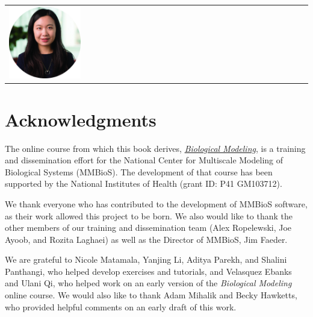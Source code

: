 {\begin{tabular}[]{l @{\hskip 0.05\textwidth} l}
\parbox{0.25\textwidth}{\noindent \href{https://www.linkedin.com/in/shuanger-li-38b300133/}{\includegraphics[width=0.25\textwidth]{../images_CMYK/li_shuanger_circle}}} & \parbox{0.7\textwidth}{}\\

\end{tabular}
}

\newpage


 
\clearpage
{}
\chapter{Acknowledgments}
\label{chapter:acknowledgments}

The online course from which this book derives, \href{https://biologicalmodeling.org}{\textit{Biological Modeling}}, is a training and dissemination effort for the National Center for Multiscale Modeling of Biological Systems (MMBioS). The development of that course has been supported by the National Institutes of Health (grant ID: P41 GM103712).

We  thank everyone who has contributed to the development of MMBioS software, as their work allowed this project to be born. We also would like to thank the other members of our training and dissemination team (Alex Ropelewski, Joe Ayoob, and Rozita Laghaei) as well as the Director of MMBioS, Jim Faeder.

We are grateful to Nicole Matamala, Yanjing Li, Aditya Parekh, and Shalini Panthangi, who helped develop exercises and tutorials, and Velasquez Ebanks and Ulani Qi, who helped work on an early version of the \textit{Biological Modeling} online course. We would also like to thank Adam Mihalik and Becky Hawketts, who provided helpful comments on an early draft of this work.

